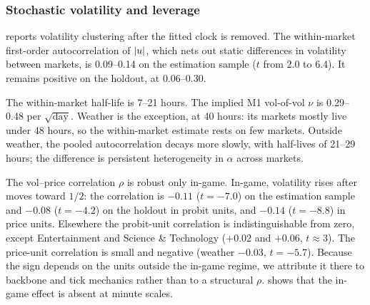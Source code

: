 \subsubsection{Stochastic volatility and leverage}\label{sec:dyn-res-sv}

 reports volatility clustering after the fitted clock is removed.
The within-market first-order autocorrelation of $|u|$, which nets out
  static differences in volatility between markets, is 0.09--0.14 on the estimation sample ($t$ from
  2.0 to 6.4). It remains positive on the holdout, at 0.06--0.30.

The within-market half-life is 7--21 hours. The implied M1 vol-of-vol
  $\nu$ is 0.29--0.48 per $\sqrt{\text{day}}$. Weather is the exception, at 40 hours: its markets
  mostly live under 48 hours, so the within-market estimate rests on few markets.
Outside weather, the pooled autocorrelation decays more
  slowly, with half-lives of 21--29 hours; the difference is persistent heterogeneity in $\alpha$
  across markets.

The vol--price correlation $\rho$ is robust only in-game.
In-game, volatility rises after moves toward $1/2$: the correlation is $-0.11$
  ($t=-7.0$) on the estimation sample and $-0.08$ ($t=-4.2$) on the holdout in probit units, and
  $-0.14$ ($t=-8.8$) in price units.
Elsewhere the probit-unit correlation is indistinguishable from zero, except
  Entertainment and Science \& Technology ($+0.02$ and $+0.06$, $t\approx3$). The price-unit
  correlation is small and negative (weather $-0.03$, $t=-5.7$).
Because the sign depends on the units outside the in-game regime, we attribute it there to
backbone and tick mechanics rather than to a structural $\rho$.  shows that the
in-game effect is absent at minute scales.

